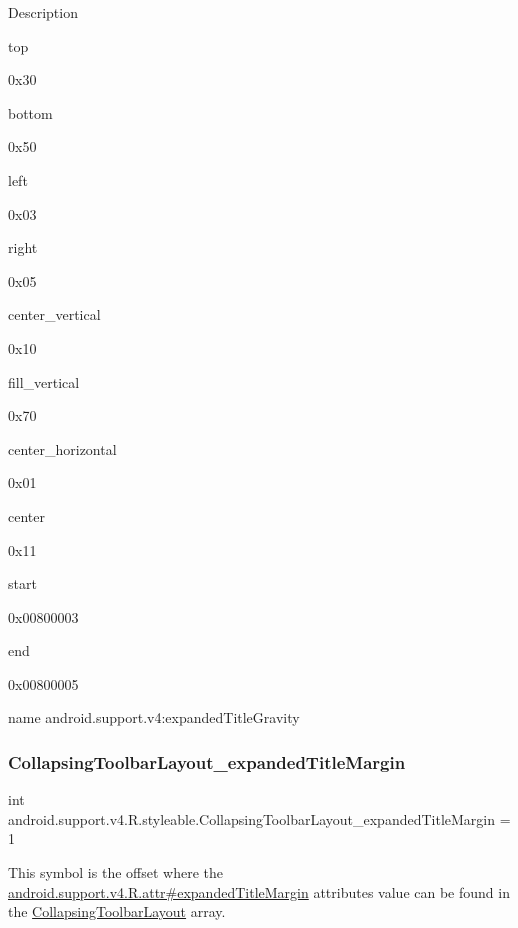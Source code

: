 Description 

{\ttfamily top}

0x30

{\ttfamily bottom}

0x50

{\ttfamily left}

0x03

{\ttfamily right}

0x05

{\ttfamily center\+\_\+vertical}

0x10

{\ttfamily fill\+\_\+vertical}

0x70

{\ttfamily center\+\_\+horizontal}

0x01

{\ttfamily center}

0x11

{\ttfamily start}

0x00800003

{\ttfamily end}

0x00800005

name android.\+support.\+v4\+:expanded\+Title\+Gravity \mbox{\label{classandroid_1_1support_1_1v4_1_1R_1_1styleable_a6fd0a1e2b2413e90f19c65f14b587b87}} 
\subsubsection{\texorpdfstring{Collapsing\+Toolbar\+Layout\+\_\+expanded\+Title\+Margin}{CollapsingToolbarLayout\_expandedTitleMargin}}
{\footnotesize\ttfamily int android.\+support.\+v4.\+R.\+styleable.\+Collapsing\+Toolbar\+Layout\+\_\+expanded\+Title\+Margin = 1\hspace{0.3cm}{\ttfamily [static]}}

This symbol is the offset where the \hyperlink{classandroid_1_1support_1_1v4_1_1R_1_1attr_a4253f12931205653e5fd1755c2755fc5}{android.\+support.\+v4.\+R.\+attr\#expanded\+Title\+Margin} attribute\textquotesingle{}s value can be found in the \hyperlink{classandroid_1_1support_1_1v4_1_1R_1_1styleable_a91b20e27088c910353d38c1efde32aa9}{Collapsing\+Toolbar\+Layout} array.

